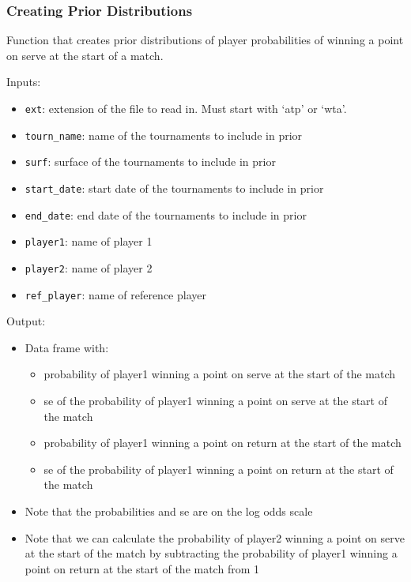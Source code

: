 \documentclass[
  letterpaper,
  DIV=11,
  numbers=noendperiod]{scrartcl}
\providecommand{\tightlist}{%
  \setlength{\itemsep}{0pt}\setlength{\parskip}{0pt}}\usepackage{longtable,booktabs,array}
\begin{document}
\linespread{2}

\subsubsection{Creating Prior
Distributions}\label{creating-prior-distributions}

Function that creates prior distributions of player probabilities of
winning a point on serve at the start of a match.

Inputs:

\begin{itemize}
\tightlist
\item
  \texttt{ext}: extension of the file to read in. Must start with `atp'
  or `wta'.
\item
  \texttt{tourn\_name}: name of the tournaments to include in prior
\item
  \texttt{surf}: surface of the tournaments to include in prior
\item
  \texttt{start\_date}: start date of the tournaments to include in
  prior
\item
  \texttt{end\_date}: end date of the tournaments to include in prior
\item
  \texttt{player1}: name of player 1
\item
  \texttt{player2}: name of player 2
\item
  \texttt{ref\_player}: name of reference player
\end{itemize}

Output:

\begin{itemize}
\tightlist
\item
  Data frame with:

  \begin{itemize}
  \tightlist
  \item
    probability of player1 winning a point on serve at the start of the
    match
  \item
    se of the probability of player1 winning a point on serve at the
    start of the match
  \item
    probability of player1 winning a point on return at the start of the
    match
  \item
    se of the probability of player1 winning a point on return at the
    start of the match
  \end{itemize}
\item
  Note that the probabilities and se are on the log odds scale
\item
  Note that we can calculate the probability of player2 winning a point
  on serve at the start of the match by subtracting the probability of
  player1 winning a point on return at the start of the match from 1
\end{itemize}
\end{document}

